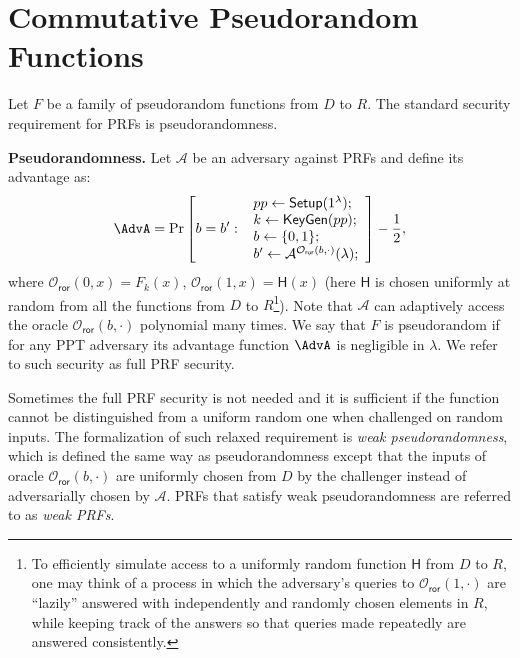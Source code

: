 \section{Commutative Pseudorandom Functions}
Let $F$ be a family of pseudorandom functions from $D$ to $R$. The standard security requirement for PRFs is pseudorandomness. 

\begin{trivlist}
\item \textbf{Pseudorandomness.} Let $\mathcal{A}$ be an adversary against PRFs and define its advantage as:
\begin{displaymath}
    \AdvA =
        \Pr \left[ b = b':~
        \begin{array}{l}
            pp \leftarrow \mathsf{Setup}(1^\lambda);\\
            k \leftarrow \mathsf{KeyGen}(pp);\\
            b \leftarrow \{0,1\}; \\
            b' \leftarrow \mathcal{A}^{\mathcal{O}_\mathsf{ror}(b, \cdot)}(\lambda);
        \end{array} 
        \right] - \frac{1}{2},
\end{displaymath}
where $\mathcal{O}_\mathsf{ror}(0, x) = F_k(x)$, $\mathcal{O}_\mathsf{ror}(1, x) = \mathsf{H}(x)$ 
(here $\mathsf{H}$ is chosen uniformly at random from all the functions 
from $D$ to $R$\footnote{To efficiently simulate access to a uniformly random function $\mathsf{H}$ from $D$ to $R$, 
one may think of a process in which the adversary's queries to $\mathcal{O}_\mathsf{ror}(1, \cdot)$ 
are ``lazily'' answered with independently and randomly chosen elements in $R$, 
while keeping track of the answers so that queries made repeatedly are answered consistently.}). 
Note that $\mathcal{A}$ can adaptively access the oracle $\mathcal{O}_\mathsf{ror}(b, \cdot)$ polynomial many times.
We say that $F$ is pseudorandom if for any PPT adversary its advantage function 
$\AdvA$ is negligible in $\lambda$. We refer to such security as full PRF security. 

Sometimes the full PRF security is not needed and it is sufficient 
if the function cannot be distinguished from a uniform random one when challenged on random inputs. 
The formalization of such relaxed requirement is \emph{weak pseudorandomness}, 
which is defined the same way as pseudorandomness except that the inputs of 
oracle $\mathcal{O}_\mathsf{ror}(b, \cdot)$ are uniformly chosen from $D$ by the challenger
instead of adversarially chosen by $\mathcal{A}$. 
PRFs that satisfy weak pseudorandomness are referred to as \emph{weak PRFs}.     
\end{trivlist}

